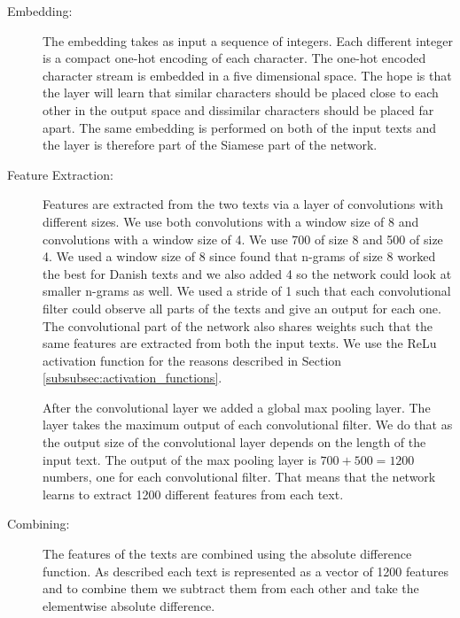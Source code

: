 \begin{description}

    \item[Embedding:]

        The embedding takes as input a sequence of integers. Each different
        integer is a compact one-hot encoding of each character. The one-hot
        encoded character stream is embedded in a five dimensional space. The
        hope is that the layer will learn that similar characters should be
        placed close to each other in the output space and dissimilar characters
        should be placed far apart. The same embedding is performed on both of
        the input texts and the layer is therefore part of the Siamese part of
        the network.

    \item[Feature Extraction:]

        Features are extracted from the two texts via a layer of convolutions
        with different sizes. We use both convolutions with a window size of
        8 and convolutions with a window size of 4. We use 700 of size 8 and
        500 of size 4. We used a window size of 8 since \citet{aalykke2016}
        found that n-grams of size 8 worked the best for Danish texts and we
        also added 4 so the network could look at smaller n-grams as well.
        We used a stride of 1 such that each convolutional filter could
        observe all parts of the texts and give an output for each one. The
        convolutional part of the network also shares weights such that the
        same features are extracted from both the input texts. We use the
        \gls{ReLu} activation function for the reasons described in Section
        \ref{subsubsec:activation_functions}.

        After the convolutional layer we added a global max pooling layer. The
        layer takes the maximum output of each convolutional filter. We do that
        as the output size of the convolutional layer depends on the length of
        the input text. The output of the max pooling layer is $700 + 500 =
        1200$ numbers, one for each convolutional filter. That means that the
        network learns to extract 1200 different features from each text.

    \item[Combining:]

        The features of the texts are combined using the absolute difference
        function. As described each text is represented as a vector of 1200
        features and to combine them we subtract them from each other and take
        the elementwise absolute difference.


\end{description}
